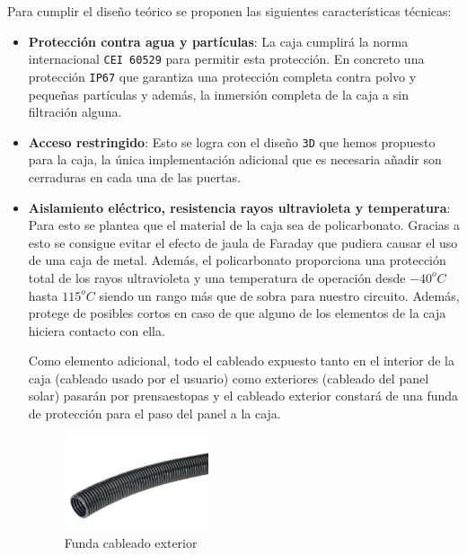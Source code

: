 Para cumplir el diseño teórico se proponen las siguientes características técnicas:
\begin{itemize}
    \item \textbf{Protección contra agua y partículas}: La caja cumplirá la norma internacional \texttt{CEI 60529} para permitir esta protección. En concreto una protección \texttt{IP67} que garantiza una protección completa contra polvo y pequeñas partículas y además, la inmersión completa de la caja a sin filtración alguna. \cite{iecInternationalStandardIEC}

    \item \textbf{Acceso restringido}: Esto se logra con el diseño \texttt{3D} que hemos propuesto para la caja, la única implementación adicional que es necesaria añadir son cerraduras en cada una de las puertas.

    \item \textbf{Aislamiento eléctrico, resistencia rayos ultravioleta y temperatura}: Para esto se plantea que el material de la caja sea de policarbonato. Gracias a esto se consigue evitar el efecto de jaula de Faraday que pudiera causar el uso de una caja de metal. Además, el policarbonato proporciona una protección total de los rayos ultravioleta y una temperatura de operación desde $-40^o C$ hasta $115^oC$ siendo un rango más que de sobra para nuestro circuito. \cite{horeshPolycarbonateProtectionUV2021} Además, protege de posibles cortos en caso de que alguno de los elementos de la caja hiciera contacto con ella.

    Como elemento adicional, todo el cableado expuesto tanto en el interior de la caja (cableado usado por el usuario) como exteriores (cableado del panel solar) pasarán por prensaestopas y el cableado exterior constará de una funda de protección para el paso del panel a la caja.
    \begin{figure}[H]
        \centering
        \includegraphics[width=0.4\textwidth]{images/4-DesarrolloTeorico/4-1-caja/CAJA_FUNDAS.png}
        \caption{Funda cableado exterior}
        \label{fig:DesarrolloTeorico/Caja/CAJA_FUNDA}
    \end{figure}


\end{itemize}
